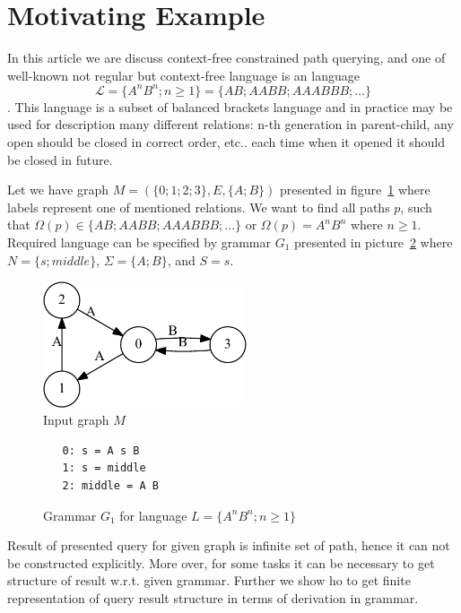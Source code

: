 \section{Motivating Example}

In this article we are discuss context-free constrained path querying, and one of well-known not regular but context-free language is an 
language $$\mathcal{L} = \{A^n B^n; n \geq 1\} = \{AB; AABB; AAABBB; \dots\}$$.
This language is a subset of balanced brackets language and in practice may be used for description many different relations: n-th generation in parent-child, any open should be closed in correct order, etc.. 
each time when it opened it should be closed in future.

Let we have graph $M=(\{0;1;2;3\},E,\{A;B\})$ presented in figure~\ref{input} where labels represent one of mentioned relations.
We want to find all paths $p$, such that $\Omega(p) \in \{AB; AABB; AAABBB; \dots\}$ or $\Omega(p) = A^n B^n$ where $n \geq 1$.
Required language can be specified by grammar $G_1$ presented in picture~\ref{grammarG} where $N = \{s; middle\}$, $\Sigma = \{A; B\}$, and $S = s$.

\begin{figure}[h]
    \begin{center}
        \includegraphics[width=6cm]{dot/input.pdf}
        \caption{Input graph $M$}
        \label{input}        
    \end{center}
\end{figure}

\begin{figure}[h]
   \begin{center}
\begin{verbatim}
   0: s = A s B 
   1: s = middle
   2: middle = A B
\end{verbatim}
   \caption{Grammar $G_1$ for language $L=\{A^n B^n; n \geq 1\}$}
   \label{grammarG}        
   \end{center}
\end{figure}

Result of presented query for given graph is infinite set of path, hence it can not be constructed explicitly. 
More over, for some tasks it can be necessary to get structure of result w.r.t. given grammar.
Further we show ho to get finite representation of query result structure in terms of derivation in grammar.

